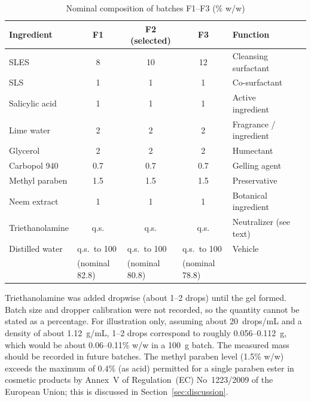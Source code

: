 \documentclass[10pt,a4paper,twocolumn]{article}
\begin{document}
\begin{table}[!htbp]
\centering

\renewcommand{\arraystretch}{1.3}
\begin{tabularx}{\textwidth}{lccclX}
\toprule
\textbf{Ingredient} & \textbf{F1} & \textbf{F2 (selected)} &
\textbf{F3} & \textbf{Function} \\
\midrule
SLES             & 8    & 10   & 12   & Cleansing surfactant \\
SLS              & 1    & 1    & 1    & Co-surfactant \\
Salicylic acid   & 1    & 1    & 1    & Active ingredient \\
Lime water       & 2    & 2    & 2    & Fragrance / ingredient \\
Glycerol         & 2    & 2    & 2    & Humectant \\
Carbopol 940     & 0.7  & 0.7  & 0.7  & Gelling agent \\
Methyl paraben   & 1.5  & 1.5  & 1.5  & Preservative \\
Neem extract     & 1    & 1    & 1    & Botanical ingredient \\
Triethanolamine  & q.s. & q.s. & q.s. & Neutralizer (see text) \\
Distilled water  & \multicolumn{1}{l}{q.s.\ to 100}
                 & \multicolumn{1}{l}{q.s.\ to 100}
                 & \multicolumn{1}{l}{q.s.\ to 100}
                 & Vehicle \\
                 & \multicolumn{1}{l}{(nominal 82.8)}
                 & \multicolumn{1}{l}{(nominal 80.8)}
                 & \multicolumn{1}{l}{(nominal 78.8)} & \\
\bottomrule
\end{tabularx}
\caption{Nominal composition of batches F1--F3 (\% w/w)}
\label{tab:composition}
\end{table}

Triethanolamine was added dropwise (about 1--2 drops) until the gel
formed. Batch size and dropper calibration were not recorded, so the
quantity cannot be stated as a percentage. For illustration only,
assuming about 20~drops/mL and a density of about 1.12~g/mL, 1--2 drops
correspond to roughly 0.056--0.112~g, which would be about 0.06--0.11\%
w/w in a 100~g batch. The measured mass should be recorded in future
batches. The methyl paraben level (1.5\% w/w) exceeds the maximum of
0.4\% (as acid) permitted for a single paraben ester in cosmetic products
by Annex~V of Regulation~(EC) No~1223/2009 of the European Union; this
is discussed in Section~\ref{sec:discussion}.
\end{document}
